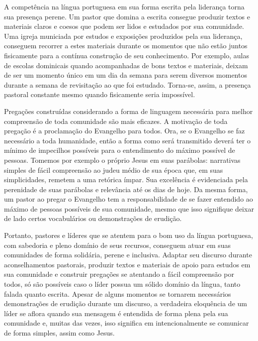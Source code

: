 \documentclass[
    article,            %
	12pt,				%
	oneside,			%
	a4paper,			%
	chapter=TITLE,		%
	section=TITLE,		%
	english,			%
	french,				%
	spanish,			%
	brazil				%
	]{abntex2}
\begin{document}
A competência na língua portuguesa em sua forma escrita pela liderança torna sua presença perene. Um pastor que domina a escrita consegue produzir textos e materiais claros e coesos que podem ser lidos e estudados por sua comunidade. Uma igreja municiada por estudos e exposições produzidos pela sua liderança, conseguem recorrer a estes materiais durante os momentos que não estão juntos fisicamente para a contínua construção de seu conhecimento. Por exemplo, aulas de escolas dominicais quando acompanhadas de bons textos e materiais, deixam de ser um momento único em um dia da semana para serem diversos momentos durante a semana de revisitação ao que foi estudado. Torna-se, assim, a presença pastoral constante mesmo quando fisicamente seria impossível.

Pregações construídas considerando a forma de linguagem necessária para melhor compreensão de toda comunidade são mais eficazes. A motivação de toda pregação é a proclamação do Evangelho para todos. Ora, se o Evangelho se faz necessário a toda humanidade, então a forma como será transmitido deverá ter o mínimo de impecilhos possíveis para o entendimento do máximo possível de pessoas. Tomemos por exemplo o próprio Jesus em suas parábolas: narrativas simples de fácil compreensão ao judeu médio de sua época que, em suas simplicidades, remetem a uma retórica ímpar. Sua excelência é evidenciada pela perenidade de suas parábolas e relevância até os dias de hoje. Da mesma forma, um pastor ao pregar o Evangelho tem a responsabilidade de se fazer entendido ao máximo de pessoas possíveis de sua comunidade, mesmo que isso signifique deixar de lado certos vocabulários ou demonstrações de erudição.

Portanto, pastores e líderes que se atentem para o bom uso da língua portuguesa, com sabedoria e pleno domínio de seus recursos, conseguem atuar em suas comunidades de forma solidária, perene e inclusiva. Adaptar seu discurso durante aconselhamentos pastorais, produzir textos e materiais de apoio para estudos em sua comunidade e construir pregações se atentando a fácil compreensão por todos, só são possíveis caso o líder possua um sólido domínio da língua, tanto falada quanto escrita. Apesar de alguns momentos se tornarem necessários demonstrações de erudição durante um discurso, a verdadeira eloquência de um líder se aflora quando sua mensagem é entendida de forma plena pela sua comunidade e, muitas das vezes, isso significa em intencionalmente se comunicar de forma simples, assim como Jesus.
% 
\end{document}
